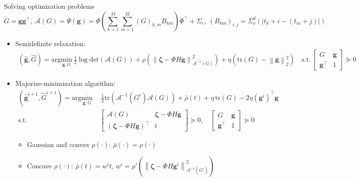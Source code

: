 \documentclass[smaller,aspectratio=169]{beamer}        %
\newcommand{\norm}[1]{\left\lVert#1\right\rVert}
\newcommand{\tr}[1]{\mathrm{tr}\left(#1\right)}
\newcommand{\dett}[1]{\mathrm{det}\left(#1\right)}
\begin{document}
\begin{frame}{Solving optimization problems}
    \[G=\mathbf{g}\mathbf{g}^\top,\ \mathcal{A}(G)=\Psi(\mathbf{g})=\Phi\left(\sum_{k=1}^M\sum_{m=1}^M (G)_{k,m}B_{km}\right)\Phi^\top+\Sigma_\epsilon,\ (B_{km})_{i,j}=\Sigma_\nu^d(|t_k+i-(t_m+j)|)\]
    \begin{itemize}
        \item Semidefinite relaxation:
        \begin{align*}
        (\hat{\mathbf{g}},\hat{G})=\mathrm{arg}\underset{\mathbf{g},G}{\mathrm{min}}\ \frac12\log\dett{\mathcal{A}(G)}+\rho\left(\norm{\boldsymbol{\zeta}-\Phi H\mathbf{g}}_{\mathcal{A}^{-1}(G)}^2\right)+\eta(\tr{G}-\norm{\mathbf{g}}_2^2)\quad        \text{s.t.}\ \begin{bmatrix}
            G&\mathbf{g}\\
            \mathbf{g}^\top&1
        \end{bmatrix}\succeq 0
        \end{align*}
        \item Majorize-minimization algorithm:
        \begin{align*}
            (\hat{\mathbf{g}}^{i+1},\hat{G}^{i+1})=\mathrm{arg}\underset{\mathbf{g},G}{\mathrm{min}}
            &\ \ 
            \frac12\tr{\mathcal{A}^{-1}(G^i)\mathcal{A}(G)}
            +\bar{\rho}(t)+
            \eta\,\tr{G}-
            2\eta(\mathbf g^i)^\top\mathbf g\\
            \text{s.t.}
            &\ 
            \begin{bmatrix}
            \mathcal{A}(G) & \boldsymbol\zeta-\Phi H\mathbf g\\
            (\boldsymbol\zeta-\Phi H\mathbf g)^\top & t
            \end{bmatrix}
            \succeq 0,\quad
            \begin{bmatrix}
            G & \mathbf g\\
            \mathbf g^\top & 1
            \end{bmatrix}
            \succeq 0
        \end{align*}
        \begin{itemize}
            \item Gaussian and convex $\rho(\cdot)$: $\bar\rho(\cdot)=\rho(\cdot)$
            \item Concave $\rho(\cdot)$: $\bar\rho(t)=w^it$, $w^i=\rho'\left(\norm{\boldsymbol{\zeta}-\Phi H\mathbf{g}^i}_{\mathcal{A}^{-1}(G^i)}^2\right)$
        \end{itemize}
    \end{itemize}
\end{frame}
\end{document}
